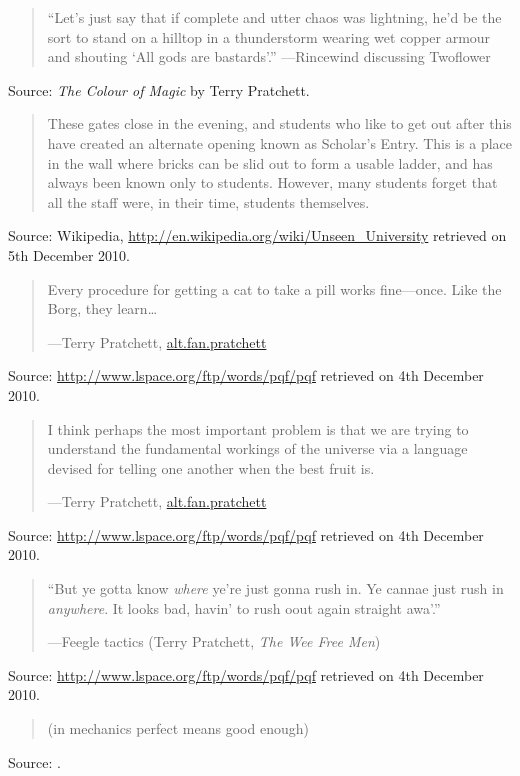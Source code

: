 \documentclass[a4paper]{article}
\begin{document}
\begin{quote}
	``Let's just say that if complete and utter chaos was lightning,
	he'd be the sort to stand on a hilltop in a thunderstorm wearing
	wet copper armour and shouting `All gods are bastards'.''
    ---Rincewind discussing Twoflower
\end{quote}
Source: \emph{The Colour of Magic} by Terry Pratchett.
\medskip

\begin{quote}
	These gates close in the evening, and students who like to
	get out after this have created an alternate opening known as
	Scholar's Entry. This is a place in the wall where bricks can
	be slid out to form a usable ladder, and has always been known
	only to students. However, many students forget that all the
	staff were, in their time, students themselves.
\end{quote}
Source: Wikipedia, \url{http://en.wikipedia.org/wiki/Unseen_University}
retrieved on 5th December 2010.
\medskip

\begin{quote}
	Every procedure for getting a cat to take a pill works fine---once.
	Like the Borg, they learn\ldots

	---Terry Pratchett, \url{alt.fan.pratchett}
\end{quote}
Source: \url{http://www.lspace.org/ftp/words/pqf/pqf} retrieved on 4th December 2010.
\medskip

\begin{quote}
	I think perhaps the most important problem is that we are trying to
	understand the fundamental workings of the universe via a language
	devised for telling one another when the best fruit is.

	---Terry Pratchett, \url{alt.fan.pratchett}
\end{quote}
Source: \url{http://www.lspace.org/ftp/words/pqf/pqf} retrieved on 4th December 2010.
\medskip

\begin{quote}
	``But ye gotta know \emph{where} ye're just gonna rush in. Ye cannae
	just rush in \emph{anywhere}. It looks bad, havin' to rush oout again
	straight awa'.''

	---Feegle tactics (Terry Pratchett, \emph{The Wee Free Men})
\end{quote}
Source: \url{http://www.lspace.org/ftp/words/pqf/pqf} retrieved on 4th December 2010.
\medskip

\begin{quote}
	(in mechanics perfect means good enough)
\end{quote}
Source: \citet{Ingalls1952}.
\medskip
\end{document}
